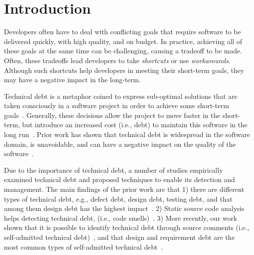 \documentclass{sig-alternate}
\newcommand{\SATD}{self-admitted technical debt\xspace}
\begin{document}
\terms{}

\keywords{}

\section{Introduction}
\label{sec:introduction}
Developers often have to deal with conflicting goals that require software to be delivered quickly, with high quality, and on budget. In practice, achieving all of these goals at the same time can be challenging, causing a tradeoff to be made. Often, these tradeoffs lead developers to take \emph{shortcuts} or use \emph{workarounds}. Although such shortcuts help developers in meeting their short-term goals, they may have a negative impact in the long-term.

Technical debt is a metaphor coined to express sub-optimal solutions that are taken consciously in a software project in order to achieve some short-term goals~\cite{Cunningham1992WPM}. Generally, these decisions allow the project to move faster in the short-term, but introduce an increased cost (i.e., debt) to maintain this software in the long run~\cite{Seaman2011,Kruchten2013IWMTD}. Prior work has shown that technical debt is widespread in the software domain, is unavoidable, and can have a negative impact on the quality of the software~\cite{Lim2012Software}.

Due to the importance of technical debt, a number of studies empirically examined technical debt and proposed techniques to enable its detection and management. The main findings of the prior work are that 1) there are different types of technical debt, e.g., defect debt, design debt, testing debt, and that among them design debt has the highest impact~\cite{Alves2014MTD,Marinescu2012IBM}. 2) Static source code analysis helps detecting technical debt, (i.e., code smells)~\cite{Marinescu2004ICSM,Marinescu2010CSMR,Zazworka2013CSE}. 3) More recently, our work shown that it is possible to identify technical debt through source comments (i.e., \SATD)~\cite{Potdar2014ICSME}, and that design and requirement debt are the most common types of \SATD~\cite{Maldonado2015MTD}.
\end{document}
